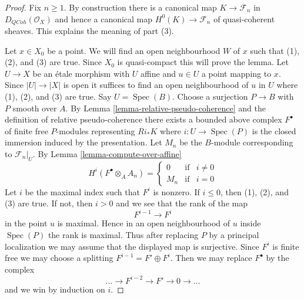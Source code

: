 \documentclass[10pt,a4paper]{amsart}
\theoremstyle{plain}
\theoremstyle{definition}
\theoremstyle{remark}
\numberwithin{equation}{subsection}
\def\Spec{\mathop{\mathrm{Spec}}}
\def\QCoh{\mathit{QCoh}}
\begin{document}
\begin{proof}
Fix $n \geq 1$. By construction there is a canonical map
$K \to \mathcal{F}_n$ in $D_\QCoh(\mathcal{O}_X)$
and hence a canonical map $H^0(K) \to \mathcal{F}_n$
of quasi-coherent sheaves. This explains the meaning of part (3).

\medskip\noindent
Let $x \in X_0$ be a point. We will find an open neighbourhood $W$
of $x$ such that (1), (2), and (3) are true. Since $X_0$ is quasi-compact
this will prove the lemma. Let $U \to X$ be an \'etale morphism
with $U$ affine and $u \in U$ a point mapping to $x$. Since $|U| \to |X|$
is open it suffices to find an open neighbourhood of $u$ in $U$
where (1), (2), and (3) are true. Say $U = \Spec(B)$.
Choose a surjection $P \to B$ with $P$ smooth over $A$.
By Lemma \ref{lemma-relative-pseudo-coherence}
and the definition of relative pseudo-coherence
there exists a bounded above complex $F^\bullet$
of finite free $P$-modules representing
$Ri_*K$ where $i : U \to \Spec(P)$ is the closed
immersion induced by the presentation.
Let $M_n$ be the $B$-module corresponding to $\mathcal{F}_n|_U$.
By Lemma \ref{lemma-compute-over-affine}
$$
H^i(F^\bullet \otimes_A A_n) =
\left\{
\begin{matrix}
0 & \text{if} & i \not = 0 \\
M_n & \text{if} & i = 0
\end{matrix}
\right.
$$
Let $i$ be the maximal index such that $F^i$ is nonzero.
If $i \leq 0$, then (1), (2), and (3) are true.
If not, then $i > 0$ and we see that the rank of the map
$$
F^{i - 1} \to F^i
$$
in the point $u$ is maximal. Hence in an open neighbourhood
of $u$ inside $\Spec(P)$ the rank is maximal. Thus after replacing
$P$ by a principal localization we may assume that the displayed
map is surjective. Since $F^i$ is finite free we may choose
a splitting $F^{i - 1} = F' \oplus F^i$. Then we may
replace $F^\bullet$ by the complex
$$
\ldots \to F^{i - 2} \to F' \to 0 \to \ldots
$$
and we win by induction on $i$.
\end{proof}
\end{document}

